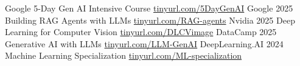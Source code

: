 
\def\mystr{3em}




\begin{cvhonors}

\cvhonor
   {Google 5-Day Gen AI Intensive Course}    %
   {
        \hfill
        \href{https://www.kaggle.com/certification/badges/seali33/96}{tinyurl.com/5DayGenAI}
        \hspace{\mystr}
   }
   {Google}      %
   {2025}    %
\cvhonor
   {Building RAG Agents with LLMs}    %
   {
        \hfill
        \href{https://learn.nvidia.com/certificates?id=_YzkKBj9QJiD-pqJ-hFLdg}{tinyurl.com/RAG-agents}
        \hspace{\mystr}
   }
   {Nvidia}      %
   {2025}    %
\cvhonor
   {Deep Learning for Computer Vision}    %
   {
        \hfill
        \href{https://www.datacamp.com/statement-of-accomplishment/course/1961cfcf80c3faab26f009fe3a5938fd352f8f7e?raw=1}{tinyurl.com/DLCVimage}
        \hspace{\mystr}
   }
   {DataCamp}      %
   {2025}    %
\cvhonor
   {Generative AI with LLMs}    %
   {
        \hfill
        \href{https://www.coursera.org/account/accomplishments/verify/GJ8B2ZK8NAXL}{tinyurl.com/LLM-GenAI}
        \hspace{\mystr}
   }
   {DeepLearning.AI}      %
   {2024}    %
\cvhonor
   {Machine Learning Specialization}    %
   {
        \hfill
        \href{https://www.coursera.org/account/accomplishments/specialization/UED4Q5KFZZM8}{tinyurl.com/ML-specialization}
        \hspace{\mystr}
}
\end{cvhonors}
